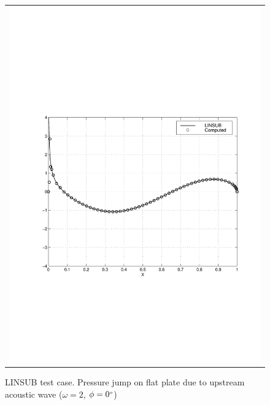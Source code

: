 \begin{figure}
\begin{center}
\begin{tabular}{c}
{        \includegraphics[width=110mm,clip=t]{CHAP_LINEAR/FIGURE/lins_pres2.pdf}}
   \end{tabular}
 \end{center}
 \vspace{-8mm}
 \caption{LINSUB test case. Pressure jump on flat plate due to upstream acoustic wave
          ($\omega = 2$, $\phi = 0^{\mbox{\tiny $o$}}$)}
 \label{linsub_pres.fig}
\end{figure}
%
